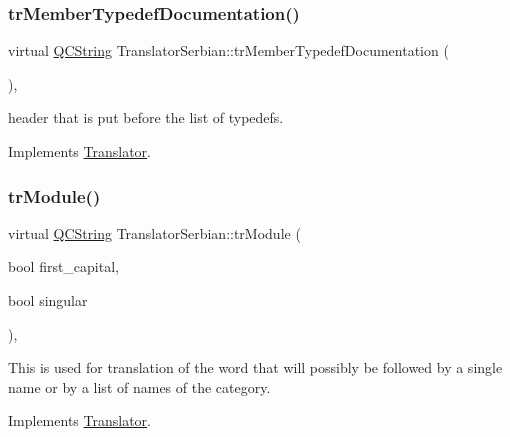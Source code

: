 \mbox{\label{class_translator_serbian_afb494d048acafc08191ef14825bd17ce}} 
\subsubsection{\texorpdfstring{trMemberTypedefDocumentation()}{trMemberTypedefDocumentation()}}
{\footnotesize\ttfamily virtual \mbox{\hyperlink{class_q_c_string}{Q\+C\+String}} Translator\+Serbian\+::tr\+Member\+Typedef\+Documentation (\begin{DoxyParamCaption}{ }\end{DoxyParamCaption})\hspace{0.3cm}{\ttfamily [inline]}, {\ttfamily [virtual]}}

header that is put before the list of typedefs. 

Implements \mbox{\hyperlink{class_translator}{Translator}}.

\mbox{\label{class_translator_serbian_ab446d12d9db48e504978ee000ac67614}} 
\subsubsection{\texorpdfstring{trModule()}{trModule()}}
{\footnotesize\ttfamily virtual \mbox{\hyperlink{class_q_c_string}{Q\+C\+String}} Translator\+Serbian\+::tr\+Module (\begin{DoxyParamCaption}\item[{bool}]{first\+\_\+capital,  }\item[{bool}]{singular }\end{DoxyParamCaption})\hspace{0.3cm}{\ttfamily [inline]}, {\ttfamily [virtual]}}

This is used for translation of the word that will possibly be followed by a single name or by a list of names of the category. 

Implements \mbox{\hyperlink{class_translator}{Translator}}.

\mbox{\label{class_translator_serbian_aceee39bcbfce870563028d9ccc58fc29}} 
